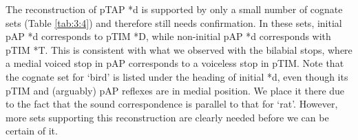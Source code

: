 The reconstruction of pTAP *d is supported by only a small number of cognate sets (Table \ref{tab:3:4}) and therefore still needs confirmation. In these sets, initial pAP *d corresponds to pTIM *D, while non-initial pAP *d corresponds with pTIM *T. This is consistent with what we observed with the bilabial stops, where a medial voiced stop in pAP corresponds to a voiceless stop in pTIM. Note that the cognate set for `bird' is listed under the heading of initial *d, even though its pTIM and (arguably) pAP reflexes are in medial position. We place it there due to the fact that the sound correspondence is parallel to that for `rat'. However, more sets supporting this reconstruction are clearly needed before we can be certain of it. 
 
